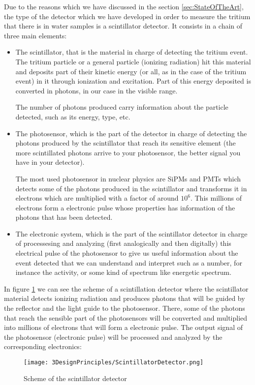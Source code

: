 Due to the reasons which we have discussed in the section \ref{sec:StateOfTheArt}, the type of the detector which we have developed in order to measure the tritium that there is in water samples is a scintillator detector. It consists in a chain of three main elements:

\begin{itemize}

\item{} The scintillator, that is the material in charge of detecting the tritium event. The tritium particle or a general particle (ionizing radiation) hit this material and deposits part of their kinetic energy (or all, as in the case of the tritium event) in it through ionization and excitation. Part of this energy deposited is converted in photons, in our case in the visible range.

The number of photons produced carry information about the particle detected, such as its energy, type, etc.

\item{} The photosensor, which is the part of the detector in charge of detecting the photons produced by the scintillator that reach its sensitive element (the more scintillated photons arrive to your photosensor, the better signal you have in your detector). 

The most used photosensor in nuclear physics are SiPMs and PMTs which detects some of the photons produced in the scintillator and transforms it in electrons which are multiplied with a factor of around $10^6$. This millions of electrons form a electronic pulse whose properties has information of the photons that has been detected.

\item{} The electronic system, which is the part of the scintillator detector in charge of processesing and analyzing (first analogically and then digitally) this electrical pulse of the photosensor to give us useful information about the event detected that we can understand and interpret such as a number, for instance the activity, or some kind of spectrum like energetic spectrum.

\end{itemize}

In figure \ref{fig:ScintillatorDetector} we can see the scheme of a scintillation detector where the scintillator material detects ionizing radiation and produces photons that will be guided by the reflector and the light guide to the photosensor. There, some of the photons that reach the sensible part of the photosensors will be converted and multiplied into millions of electrons that will form a electronic pulse. The output signal of the photosensor (electronic pulse) will be processed and analyzed by the corresponding electronics:

\begin{figure}[hbtp]
\texttt{[image: 3DesignPrinciples/ScintillatorDetector.png]}
\centering
\caption{Scheme of the scintillator detector \cite{CentelleadoresEspanyol}\label{fig:ScintillatorDetector}}
\end{figure}